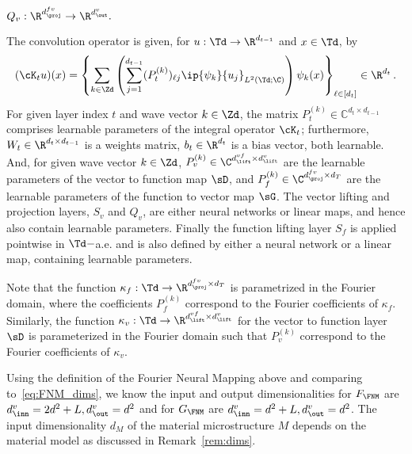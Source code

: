\documentclass[letterpaper,11pt]{article}
\begin{document}
\begin{definition}
\begin{itemize}[topsep=1.67ex,itemsep=0.5ex,partopsep=1ex,parsep=1ex,leftmargin=35ex]
         $Q_v: \R^{d_{\proj}^{fv}} \to \R^{d_{\out}^v}.$
    \end{itemize}
The convolution operator is given, for $u: \Td \to\R^{d_{t-1}}$ and $x\in\Td$, by
\begin{equation}\label{eqn:fno_Kt}
    (\cK_tu)(x) = \left\{\sum_{k \in \Zd}\left(\sum_{j=1}^{d_{t-1}} (P^{(k)}_t)_{\ell j}\ip{\psi_k}{u_j}_{L^2(\Td;\C)} \right)\psi_k(x)\right\}_{\ell\in[d_{{t}}]} \in\R^{d_{t}}\,.
\end{equation}
For given layer index $t$
and wave vector $k \in \Zd$, the matrix $P^{(k)}_t \in \mathbb{C}^{d_{{t}} \times d_{t-1}}$ comprises learnable parameters of the integral operator $\cK_t$; furthermore, $W_t \in \R^{d_{{t}}\times d_{t-1}}$ is a weights matrix, $b_t\in \R^{d_{t}}$ is a bias vector, both learnable. And, for given wave vector $k \in \Zd$, $P_v^{(k)} \in \C^{d_{\lift}^{vf} \times d_{\lift}^v}$ are the learnable parameters of the vector to function map $\sD$, and $P_f^{(k)} \in \C^{d_{\proj}^{fv}\times d_T}$ are the learnable parameters of the function to vector map $\sG$. The vector lifting and
projection layers, $S_v$ and $Q_v$, are either neural networks or linear maps, and hence also contain learnable parameters. Finally the function lifting layer $S_f$ is
applied pointwise in $\Td-$a.e. and is also defined by either a neural network or
a linear map, containing learnable parameters.
\end{definition}

\begin{remark}
Note that the function $\kappa_f: \Td \to \R^{d_{\proj}^{fv} \times d_T}$ is parametrized in the Fourier domain, where the coefficients $P_f^{(k)}$ correspond to the Fourier coefficients of $\kappa_f$. Similarly, the function $\kappa_v: \Td \to \R^{d_{\lift}^{vf} \times d_{\lift}^v}$ for the vector to function layer $\sD$ is parameterized in the Fourier domain such that $P^{(k)}_v$ correspond to the Fourier coefficients of $\kappa_v$.
\end{remark}

Using the definition of the Fourier Neural Mapping above and comparing to~\eqref{eq:FNM_dims}, we know the input and output dimensionalities for $F_{\FNM}$ are $d_{\inn}^v = 2d^2 + L, d_{\out}^v = d^2$ and for $G_{\FNM}$ are $d_{\inn}^v = d^2 + L, d_{\out}^v = d^2$. The input dimensionality $d_M$ of the material microstructure $M$ depends on the material model as discussed in Remark~\ref{rem:dims}.
\end{document}

